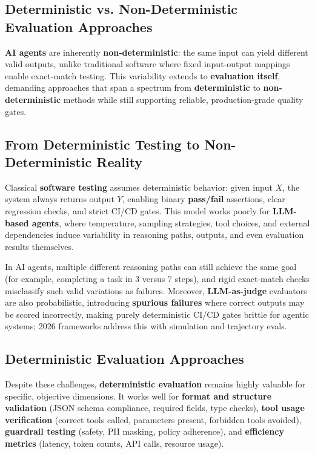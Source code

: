 \begin{TNtwocol}
\section{Deterministic vs. Non-Deterministic Evaluation Approaches}
\textbf{AI agents} are inherently \textbf{non-deterministic}: the same input can yield different valid outputs, unlike traditional software where fixed input-output mappings enable exact-match testing. This variability extends to \textbf{evaluation itself}, demanding approaches that span a spectrum from \textbf{deterministic} to \textbf{non-deterministic} methods while still supporting reliable, production-grade quality gates.
\subsection*{From Deterministic Testing to Non-Deterministic Reality}
Classical \textbf{software testing} assumes deterministic behavior: given input $X$, the system always returns output $Y$, enabling binary \textbf{pass/fail} assertions, clear regression checks, and strict CI/CD gates. This model works poorly for \textbf{LLM-based agents}, where temperature, sampling strategies, tool choices, and external dependencies induce variability in reasoning paths, outputs, and even evaluation results themselves.

In AI agents, multiple different reasoning paths can still achieve the same goal (for example, completing a task in 3 versus 7 steps), and rigid exact-match checks misclassify such valid variations as failures. Moreover, \textbf{LLM-as-judge} evaluators are also probabilistic, introducing \textbf{spurious failures} where correct outputs may be scored incorrectly, making purely deterministic CI/CD gates brittle for agentic systems; 2026 frameworks address this with simulation and trajectory evals.
​

\subsection*{Deterministic Evaluation Approaches}

Despite these challenges, \textbf{deterministic evaluation} remains highly valuable for specific, objective dimensions. It works well for \textbf{format and structure validation} (JSON schema compliance, required fields, type checks), \textbf{tool usage verification} (correct tools called, parameters present, forbidden tools avoided), \textbf{guardrail testing} (safety, PII masking, policy adherence), and \textbf{efficiency metrics} (latency, token counts, API calls, resource usage).


\end{TNtwocol}
